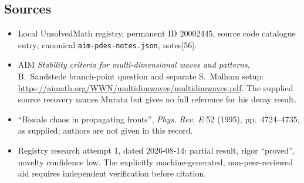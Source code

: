 \documentclass[11pt]{article}
\begin{document}
\subsection{Sources}
\begin{itemize}
\item Local UnsolvedMath registry, permanent ID 20002445, source code catalogue entry; canonical \texttt{aim-pdes-notes.json}, notes[56].
\item AIM \emph{Stability criteria for multi-dimensional waves and patterns}, B.~Sandstede branch-point question and separate S.~Malham setup: \url{https://aimath.org/WWN/multidimwaves/multidimwaves.pdf}. The supplied source recovery names Murata but gives no full reference for his decay result.
\item ``Biscale chaos in propagating fronts'', \emph{Phys. Rev. E} 52 (1995), pp.~4724--4735, as supplied; authors are not given in this record.
\item Registry research attempt 1, dated 2026-08-14: partial result, rigor ``proved'', novelty confidence low. The explicitly machine-generated, non-peer-reviewed aid requires independent verification before citation.
\end{itemize}
\end{document}

